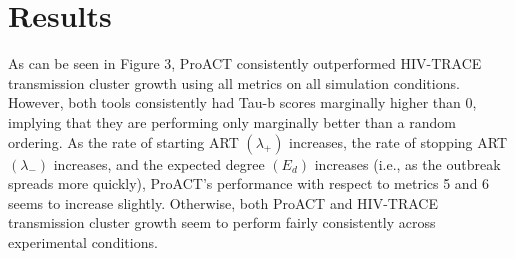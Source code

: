 \documentclass[twocolumn]{bmcart}%
\begin{document}
\section*{Results}
As can be seen in Figure 3, ProACT consistently outperformed HIV-TRACE transmission cluster growth using all metrics on all simulation conditions. However, both tools consistently had Tau-b scores marginally higher than 0, implying that they are performing only marginally better than a random ordering.
As the rate of starting ART $\left(\lambda_+\right)$ increases, the rate of stopping ART $\left(\lambda_-\right)$ increases, and the expected degree $\left(E_d\right)$ increases (i.e., as the outbreak spreads more quickly), ProACT's performance with respect to metrics 5 and 6 seems to increase slightly. Otherwise, both ProACT and HIV-TRACE transmission cluster growth seem to perform fairly consistently across experimental conditions.


\end{document}
